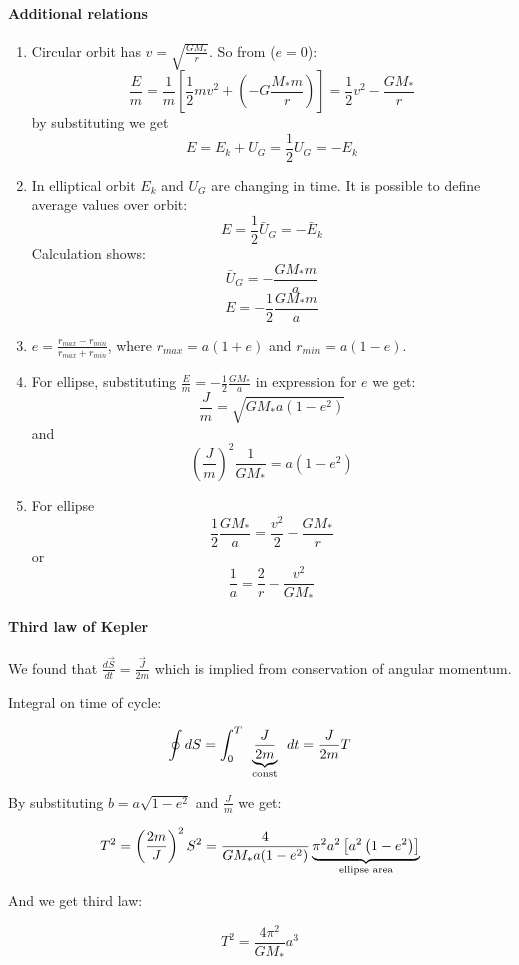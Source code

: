 \paragraph{Additional relations}
\begin{enumerate}
	\item Circular orbit has $v = \sqrt{\frac{GM_*}{r}}$. So from ($e=0$):
	$$\frac{E}{m} = \frac{1}{m} \left[ \frac{1}{2}mv^2 + \left( -G\frac{M_*m}{r} \right) \right] = \frac{1}{2}v^2 - \frac{GM_*}{r}$$
	by substituting we get
	$$E = E_k+U_G = \frac{1}{2}U_G = -E_k$$
	\item In elliptical orbit $E_k$ and $U_G$ are changing in time. It is possible to define average values over orbit:
	$$E = \frac{1}{2}\bar{U}_G = - \bar{E}_k$$
	Calculation shows:
	$$\bar{U}_G = -\frac{GM_*m}{a}$$
	$$E = -\frac{1}{2}\frac{GM_*m}{a}$$
	\item $e=\frac{r_{max}-r_{min}}{r_{max}+r_{min}}$, where $r_{max}=a(1+e)$ and $r_{min}=a(1-e)$.
	\item For ellipse, substituting $\frac{E}{m} = -\frac{1}{2}\frac{GM_*}{a}$ in expression for $e$ we get:
	$$\frac{J}{m} = \sqrt{GM_*a(1-e^2)}$$ and
	$$\left( \frac{J}{m} \right)^2\frac{1}{GM_*} = a(1-e^2)$$
	\item For ellipse 
	$$\frac{1}{2}\frac{GM_*}{a}= \frac{v^2}{2}-\frac{GM_*}{r}$$
	or
	$$\frac{1}{a} = \frac{2}{r} - \frac{v^2}{GM_*}$$
\end{enumerate}

\paragraph{Third law of Kepler}
We found that $\frac{d\vec{S}}{dt} = \frac{\vec{J}}{2m}$ which is implied from conservation of angular momentum.

Integral on time of cycle:

$$\oint dS = \int_0^T \underbrace{\frac{J}{2m}}_{\parbox{1cm}{\centering \scriptsize const}} dt = \frac{J}{2m}T$$

By substituting $b=a\sqrt{1-e^2}$ and $\frac{J}{m}$ we get:

$$T^2 = \left( \frac{2m}{J} \right)^2 S^2 = \frac{4}{GM_*a(1-e^2)}\underbrace{\pi^2 a^2 \left[ a^2 \left( 1 - e^2 \right) \right]}_{\parbox{2cm}{\centering \scriptsize ellipse area}}$$

And we get third law:

$$T^2 = \frac{4\pi^2}{GM_*}a^3$$

